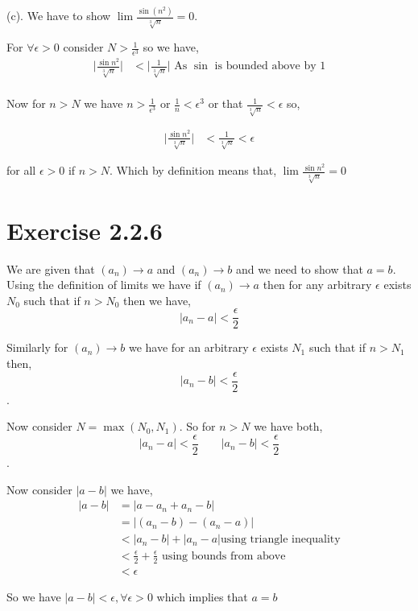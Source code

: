 \documentclass[a4paper]{report}
\begin{document}
\vspace{1em}
(c). We have  to show $\lim \frac{\sin(n^2)}{\sqrt[3]{n}} = 0$. 

\vspace{1em}

For $\forall \epsilon > 0$ consider $N > \frac{1}{\epsilon^3}$ so we have, 
\begin{align*}
    \bigg | \frac{\sin n^2}{\sqrt[3]{n}} \bigg | &< \bigg | \frac{1}{\sqrt[3]{n}} \bigg | \text{ As $\sin$ is bounded above by $1$}\\
\end{align*}

Now for $n > N$ we have $n > \frac{1}{\epsilon^{3}}$  or $\frac{1}{n}< \epsilon^{3}$  or that $\frac{1}{\sqrt[3]{n}} < \epsilon$ so, 

\begin{align*}
    \bigg | \frac{\sin n^2}{\sqrt[3]{n}} \bigg | &< \frac{1}{\sqrt[3]{n}} < \epsilon
\end{align*}

for all $\epsilon > 0$ if $n > N$. Which by definition means that, $\lim \frac{\sin n^2}{\sqrt[3]{n}} = 0$


\section*{Exercise 2.2.6}

We are given that $(a_n) \to a $ and  $(a_n) \to b$ and we need to show that $a = b$. Using the definition of limits we have if  $(a_n) \to a$ then for any arbitrary $\epsilon$ exists $N_0$ such that if $n > N_0$ then we have,  
$$ |a_n - a| < \frac{\epsilon}{2} $$ 

Similarly for $(a_n) \to b$ we have  for an arbitrary  $ \epsilon$ exists $N_1$ such that if $n > N_1$ then, 
$$ |a_n - b | < \frac{\epsilon}{2} $$.

Now consider  $N = \max(N_0, N_1)$. So for $n > N$ we have both, 
$$ |a_n - a| < \frac{\epsilon}{2} \qquad |a_n - b | < \frac{\epsilon}{2} $$.

Now consider $|a - b|$ we have, 
 \begin{align*}
     |a - b |  &= |a - a_n + a_n - b|\\
               &= |(a_n - b) - (a_n - a)|\\
               &< |a_n - b| + |a_n - a| \text{using triangle inequality}\\
               &< \frac{\epsilon}{2} + \frac{\epsilon}{2} \text{ using bounds from above}\\
               &< \epsilon
\end{align*}

So we have $|a - b| < \epsilon, \forall \epsilon > 0$ which implies that $a = b$
\end{document}
